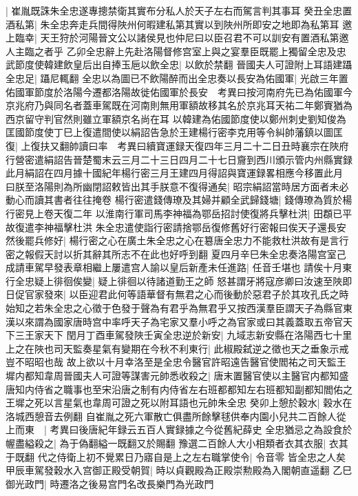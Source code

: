 |{
	崔胤既誅朱全忠遂專摠禁衛其實布分私人於天子左右而駕言判其事耳}
癸丑全忠置酒私第|{
	朱全忠奔走兵間得陜州何暇建私第其實以到陜州所即安之地即為私第耳}
邀上臨幸|{
	天王狩於河陽晉文公以諸侯見也仲尼曰以臣召君不可以訓安有置酒私第邀人主臨之者乎}
乙卯全忠辭上先赴洛陽督修宫室上與之宴羣臣既罷上獨留全忠及忠武節度使韓建飲皇后出自捧玉巵以飲全忠|{
	以飲於禁翻}
晉國夫人可證附上耳語建躡全忠足|{
	躡尼輒翻}
全忠以為圖已不飲陽醉而出全忠奏以長安為佑國軍|{
	光啟三年置佑國軍節度於洛陽今遷都洛陽故徙佑國軍於長安　考異曰按河南府先已為佑國軍今京兆府乃與同名者蓋車駕既在河南則無用軍額故移其名於京兆耳天祐二年鄭賨猶為西京留守判官然則雖立軍額京名尚在耳}
以韓建為佑國節度使以鄭州刺史劉知俊為匡國節度使丁巳上復遣間使以絹詔告急於王建楊行密李克用等令糾帥藩鎮以圖匡復|{
	上復扶又翻帥讀曰率　考異曰續寶運録天復四年三月二十二日丑時襄宗在陜府行營密遣絹詔告晉楚蜀末云三月二十三日四月二十七日齎到西川頒示管内州縣實録此月絹詔在四月據十國紀年楊行密三月王建四月得詔與寶運録畧相應今移置此月}
曰朕至洛陽則為所幽閉詔敕皆出其手朕意不復得通矣|{
	昭宗絹詔當時居方面者未必動心而讀其書者往往掩卷}
楊行密遣錢傳璙及其婦并顧全武歸錢塘|{
	錢傳璙為質於楊行密見上卷天復二年}
以淮南行軍司馬李神福為鄂岳招討使復將兵擊杜洪|{
	田頵已平故復遣李神福擊杜洪}
朱全忠遣使詣行密請捨鄂岳復修舊好行密報曰俟天子還長安然後罷兵修好|{
	楊行密之心在廣土朱全忠之心在簒唐全忠力不能救杜洪故有是言行密之報假天討以折其辭其所志不在此也好呼到翻}
夏四月辛巳朱全忠奏洛陽宫室己成請車駕早發表章相繼上屢遣宫人諭以皇后新產未任進路|{
	任音壬堪也}
請俟十月東行全忠疑上徘徊俟變|{
	疑上徘徊以待諸道勤王之師}
怒甚謂牙將寇彦卿曰汝速至陜即日促官家發來|{
	以臣迎君此何等語華督有無君之心而後動於惡君子於其攻孔氏之時始知之若朱全忠之心徵于色發于聲為有君乎為無君乎又按西漢羣臣謂天子為縣官東漢以來謂為國家唐時宫中率呼天子為宅家又羣小呼之為官家或曰其義蓋取五帝官天下三王家天下}
閏月丁酉車駕發陜壬寅全忠逆於新安|{
	九域志新安縣在洛陽西七十里}
上之在陜也司天監奏星氣有變期在今秋不利東行|{
	此椒殿弑逆之徵也天之垂象示戒豈不昭昭也哉}
故上欲以十月幸洛至是全忠令醫官許昭遠告醫官使閻祐之司天監王墀内都知韋周晉國夫人可證等謀害元帥悉收殺之|{
	唐末置醫官使以主醫官内都知盛唐知内侍省之職事也至宋沿唐之制有内侍省左右班都都知左右班都知副都知閻佑之王墀之死以言星氣也韋周可證之死以附耳語也元帥朱全忠}
癸卯上憩於穀水|{
	穀水在洛城西憩音去例翻}
自崔胤之死六軍散亡俱盡所餘擊毬供奉内園小兒共二百餘人從上而東　|{
	考異曰後唐紀年録云五百人實録據之今從舊紀薛史}
全忠猶忌之為設食於幄盡縊殺之|{
	為于偽翻縊一既翻又於賜翻}
豫選二百餘人大小相類者衣其衣服|{
	衣其于既翻}
代之侍衛上初不覺累日乃寤自是上之左右職掌使令|{
	令音零}
皆全忠之人矣甲辰車駕發穀水入宫御正殿受朝賀|{
	時以貞觀殿為正殿崇勲殿為入閣朝直遥翻}
乙巳御光政門|{
	時遷洛之後易宫門名改長樂門為光政門}
